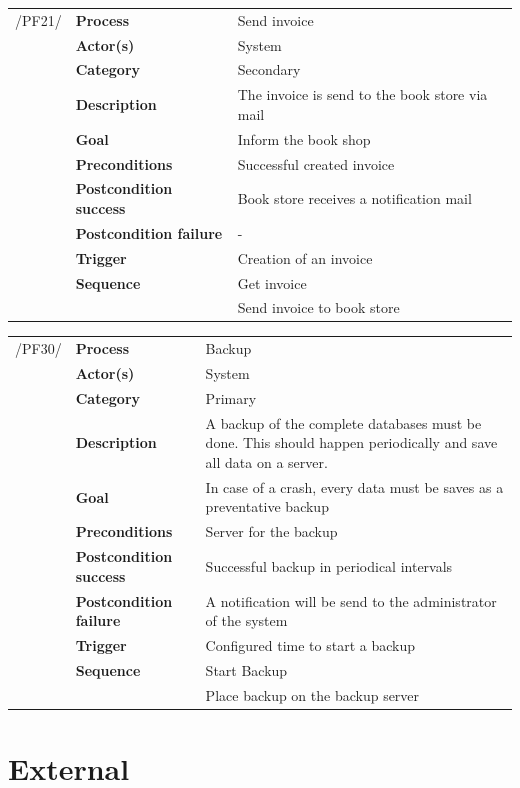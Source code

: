 \documentclass[11pt,a4paper,oneside,svgnames]{report}
\begin{document}
\noindent
\begin{tabular}{p{1.5cm}p{3cm}p{8cm}}
/PF21/	& \textbf{Process} & Send invoice\\
		& \textbf{Actor(s)} & System\\
		& \textbf{Category} & Secondary\\
		& \textbf{Description}	 & The invoice is send to the book store via mail\\
		& \textbf{Goal} & Inform the book shop\\
		& \textbf{Preconditions} & Successful created invoice\\
		& \textbf{Postcondition success} & Book store receives a notification mail\\
		& \textbf{Postcondition failure} & -\\
		& \textbf{Trigger} & Creation of an invoice\\
		& \textbf{Sequence} & Get invoice\\
		& & Send invoice to book store
		
\hfill \\
\end{tabular}

\noindent
\begin{tabular}{p{1.5cm}p{3cm}p{8cm}}
/PF30/	& \textbf{Process} & Backup\\
		& \textbf{Actor(s)} & System\\
		& \textbf{Category} & Primary\\
		& \textbf{Description}	 & A backup of the complete databases must be done. This should happen periodically and save all data on a server.\\
		& \textbf{Goal} & In case of a crash, every data must be saves as a preventative backup\\
		& \textbf{Preconditions} & Server for the backup\\
		& \textbf{Postcondition success} & Successful backup in periodical intervals\\
		& \textbf{Postcondition failure} & A notification will be send to the administrator of the system\\
		& \textbf{Trigger} & Configured time to start a backup\\
		& \textbf{Sequence} & Start Backup\\
		& & Place backup on the backup server
		
\hfill \\
\end{tabular}

\section{External}
\end{document}
